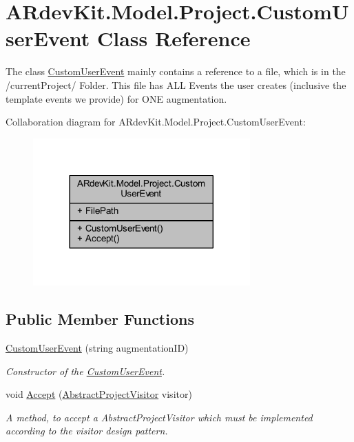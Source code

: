 \hypertarget{class_a_rdev_kit_1_1_model_1_1_project_1_1_custom_user_event}{\section{A\-Rdev\-Kit.\-Model.\-Project.\-Custom\-User\-Event Class Reference}
\label{class_a_rdev_kit_1_1_model_1_1_project_1_1_custom_user_event}
}


The class \hyperlink{class_a_rdev_kit_1_1_model_1_1_project_1_1_custom_user_event}{Custom\-User\-Event} mainly contains a reference to a file, which is in the /current\-Project/ Folder. This file has A\-L\-L Events the user creates (inclusive the template events we provide) for O\-N\-E augmentation.  




Collaboration diagram for A\-Rdev\-Kit.\-Model.\-Project.\-Custom\-User\-Event\-:
\nopagebreak
\begin{figure}[H]
\begin{center}
\leavevmode
\includegraphics[width=236pt]{class_a_rdev_kit_1_1_model_1_1_project_1_1_custom_user_event__coll__graph}
\end{center}
\end{figure}
\subsection*{Public Member Functions}
\begin{DoxyCompactItemize}
\item 
\hyperlink{class_a_rdev_kit_1_1_model_1_1_project_1_1_custom_user_event_a57e6abd6b60a1b156cc6f025b5ba8e0e}{Custom\-User\-Event} (string augmentation\-I\-D)
\begin{DoxyCompactList}\small\item\em Constructor of the \hyperlink{class_a_rdev_kit_1_1_model_1_1_project_1_1_custom_user_event}{Custom\-User\-Event}. \end{DoxyCompactList}\item 
void \hyperlink{class_a_rdev_kit_1_1_model_1_1_project_1_1_custom_user_event_aa652f9348729297a9749aafa5a3efefb}{Accept} (\hyperlink{class_a_rdev_kit_1_1_controller_1_1_project_controller_1_1_abstract_project_visitor}{Abstract\-Project\-Visitor} visitor)
\begin{DoxyCompactList}\small\item\em A method, to accept a Abstract\-Project\-Visitor which must be implemented according to the visitor design pattern. \end{DoxyCompactList}\end{DoxyCompactItemize}
